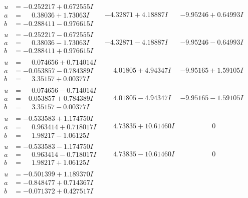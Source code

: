 \documentclass[1p]{elsarticle_modified}
\theoremstyle{definition}
\begin{document}
$$\begin{array}{c|c|c}
\begin{aligned}
u &= -0.252217 + 0.672555 I \\
a &= \phantom{-}0.38036 + 1.73063 I \\
b &= -0.288411 - 0.976615 I\end{aligned}
 & -4.32871 + 4.18887 I & -9.95246 + 0.64993 I \\ \hline\begin{aligned}
u &= -0.252217 - 0.672555 I \\
a &= \phantom{-}0.38036 - 1.73063 I \\
b &= -0.288411 + 0.976615 I\end{aligned}
 & -4.32871 - 4.18887 I & -9.95246 - 0.64993 I \\ \hline\begin{aligned}
u &= \phantom{-}0.074656 + 0.714014 I \\
a &= -0.053857 - 0.784389 I \\
b &= \phantom{-}3.35157 + 0.00377 I\end{aligned}
 & \phantom{-}4.01805 + 4.94347 I & -9.95165 + 1.59105 I \\ \hline\begin{aligned}
u &= \phantom{-}0.074656 - 0.714014 I \\
a &= -0.053857 + 0.784389 I \\
b &= \phantom{-}3.35157 - 0.00377 I\end{aligned}
 & \phantom{-}4.01805 - 4.94347 I & -9.95165 - 1.59105 I \\ \hline\begin{aligned}
u &= -0.533583 + 1.174750 I \\
a &= \phantom{-}0.963414 + 0.718017 I \\
b &= \phantom{-}1.98217 - 1.06125 I\end{aligned}
 & \phantom{-}4.73835 + 10.61460 I & \phantom{-0.000000 } 0 \\ \hline\begin{aligned}
u &= -0.533583 - 1.174750 I \\
a &= \phantom{-}0.963414 - 0.718017 I \\
b &= \phantom{-}1.98217 + 1.06125 I\end{aligned}
 & \phantom{-}4.73835 - 10.61460 I & \phantom{-0.000000 } 0 \\ \hline\begin{aligned}
u &= -0.501399 + 1.189370 I \\
a &= -0.848477 + 0.714367 I \\
b &= -0.071372 + 0.427517 I\end{aligned}

\end{array}$$
\end{document}
